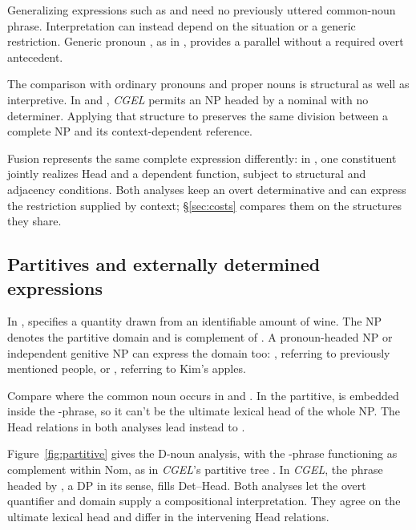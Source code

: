 \documentclass[12pt]{article}
\begin{document}
Generalizing expressions such as  and  need no previously uttered common-noun phrase. Interpretation can instead depend on the situation or a generic restriction. Generic pronoun , as in , provides a parallel without a required overt antecedent.

The comparison with ordinary pronouns and proper nouns is structural as well as interpretive. In  and , \textit{CGEL} permits an NP headed by a nominal with no determiner. Applying that structure to  preserves the same division between a complete NP and its context-dependent reference.

Fusion represents the same complete expression differently: in \textcite{Payne2007}, one constituent jointly realizes Head and a dependent function, subject to structural and adjacency conditions. Both analyses keep an overt determinative and can express the restriction supplied by context; §\ref{sec:costs} compares them on the structures they share.

\subsection{Partitives and externally determined expressions}\label{sec:modification}

In ,  specifies a quantity drawn from an identifiable amount of wine. The NP  denotes the partitive domain and is complement of . A pronoun-headed NP or independent genitive NP can express the domain too: , referring to previously mentioned people, or , referring to Kim's apples.

Compare where the common noun occurs in  and . In the partitive,  is embedded inside the -phrase, so it can't be the ultimate lexical head of the whole NP. The Head relations in both analyses lead instead to .

Figure~\ref{fig:partitive} gives the D-noun analysis, with the -phrase functioning as complement within Nom, as in \textit{CGEL}'s partitive tree \citep[411--412]{huddleston2002}. In \textit{CGEL}, the phrase headed by , a DP in its sense, fills Det--Head. Both analyses let the overt quantifier and domain supply a compositional interpretation. They agree on the ultimate lexical head and differ in the intervening Head relations.
\end{document}
